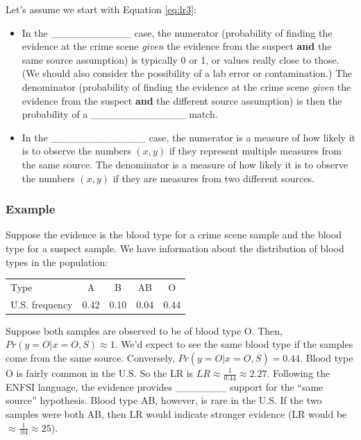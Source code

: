 \documentclass[]{book}
\providecommand{\tightlist}{%
  \setlength{\itemsep}{0pt}\setlength{\parskip}{0pt}}
\theoremstyle{definition}
\theoremstyle{definition}
\theoremstyle{remark}
\begin{document}
Let's assume we start with Equation \ref{eq:lr3}:

\begin{itemize}
\tightlist
\item
  In the \_\_\_\_\_\_\_\_\_\_\_ case, the numerator (probability of
  finding the evidence at the crime scene \emph{given} the evidence from
  the suspect \textbf{and} the same source assumption) is typically 0 or
  1, or values really close to those. (We should also consider the
  possibility of a lab error or contamination.) The denominator
  (probability of finding the evidence at the crime scene \emph{given}
  the evidence from the suspect \textbf{and} the different source
  assumption) is then the probability of a \_\_\_\_\_\_\_\_\_\_\_\_\_
  match. \vspace{.1in}
\item
  In the \_\_\_\_\_\_\_\_\_\_\_\_\_ case, the numerator is a measure of
  how likely it is to observe the numbers \((x,y)\) if they represent
  multiple measures from the same source. The denominator is a measure
  of how likely it is to observe the numbers \((x,y)\) if they are
  measures from two different sources.
\end{itemize}

\subsubsection{Example}\label{example-2}

Suppose the evidence is the blood type for a crime scene sample and the
blood type for a suspect sample. We have information about the
distribution of blood types in the population:

\begin{tabular}{l|cccc}
Type & A & B & AB & O \\
U.S. frequency & 0.42 & 0.10 & 0.04 & 0.44
\end{tabular}

Suppose both samples are observed to be of blood type O. Then,
\(Pr(y = O|x = O,S) \approx 1\). We'd expect to see the same blood type
if the samples come from the same source. Conversely,
\(Pr(y = O|x = O,\overline{S}) = 0.44\). Blood type O is fairly common
in the U.S. So the LR is \(LR \approx \frac{1}{0.44} \approx 2.27\).
Following the ENFSI language, the evidence provides \_\_\_\_\_\_\_
support for the ``same source'' hypothesis. Blood type AB, however, is
rare in the U.S. If the two samples were both AB, then LR would indicate
stronger evidence (LR would be \(\approx \frac{1}{.04} \approx 25\)).
\end{document}

